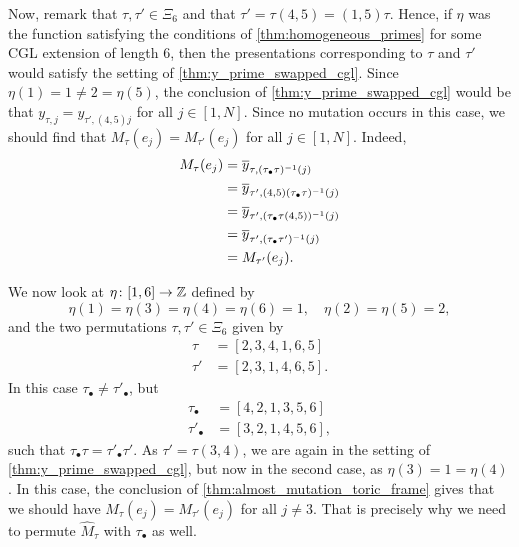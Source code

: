 \begin{example}
	Now, remark that $\tau, \tau' \in \Xi_6$ and that $\tau' = \tau (4, 5) = (1,5) \tau$.
	Hence, if $\eta$ was the function satisfying the conditions of
	\cref{thm:homogeneous_primes} for some CGL extension of length 6, then the
	presentations corresponding to $\tau$ and $\tau'$ would satisfy the setting of
	\cref{thm:y_prime_swapped_cgl}. Since $\eta(1) = 1 \neq 2 = \eta(5)$, the conclusion of
	\cref{thm:y_prime_swapped_cgl} would be that $y_{\tau, j} = y_{\tau', (4,5)j}$ for all
	$j \in [1, N]$. Since no mutation occurs in this case, we should find that $M_\tau
		(e_j) = M_{\tau'}(e_j)$ for all $j \in [1, N]$. Indeed,
	\begin{align*}
		M_{\tau}(e_j)
		 & = \overline{y}_{\tau, (\tau_\bullet \tau)^{-1} (j)}        \\
		 & = \overline{y}_{\tau', (4,5)(\tau_\bullet \tau)^{-1} (j)}  \\
		 & = \overline{y}_{\tau', (\tau_\bullet \tau (4,5))^{-1} (j)} \\
		 & = \overline{y}_{\tau', (\tau_\bullet \tau')^{-1} (j)}      \\
		 & = M_{\tau'}(e_j).
	\end{align*}
\end{example}
\begin{example}
	We now look at $\eta \colon [1,6] \to \mathbb{Z}$ defined by
	\begin{equation*}
		\eta(1) = \eta(3) = \eta(4) = \eta(6) = 1, \quad \eta(2) = \eta(5) = 2,
	\end{equation*}
	and the two permutations $\tau, \tau' \in \Xi_6$ given by
	\begin{align*}
		\tau  & = [2,3,4,1,6,5]  \\
		\tau' & = [2,3,1,4,6,5].
	\end{align*}
	In this case $\tau_\bullet \neq \tau'_\bullet$, but
	\begin{align*}
		\tau_\bullet  & = [4,2,1,3,5,6]  \\
		\tau'_\bullet & = [3,2,1,4,5,6],
	\end{align*}
	such that $\tau_\bullet \tau = \tau'_\bullet \tau'$. As $\tau' = \tau (3,4)$, we are
	again in the setting of \cref{thm:y_prime_swapped_cgl}, but now in the second case, as
	$\eta(3) = 1 = \eta(4)$. In this case, the conclusion of
	\cref{thm:almost_mutation_toric_frame} gives that we should have $M_\tau (e_j) =
		M_{\tau'}(e_j)$ for all $j \neq 3$. That is precisely why we need to permute
	$\widehat{M}_\tau$ with $\tau_\bullet$ as well.
\end{example}

